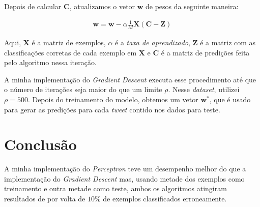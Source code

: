 \documentclass[a4paper, 12pt]{article}
\begin{document}
Depois de calcular $\boldsymbol{C}$,  atualizamos o vetor $\boldsymbol{w}$
de pesos da seguinte maneira:

\begin{align*}
    \boldsymbol{w} = \boldsymbol{w} - \alpha \frac{1}{M} \boldsymbol{X}(\boldsymbol{C} - \boldsymbol{Z})
\end{align*}

Aqui, $\boldsymbol{X}$ é a matriz de exemplos, $\alpha$ é a \textit{taxa de
aprendizado}, $\boldsymbol{Z}$ é a matriz com as classificações corretas de
cada exemplo em $\boldsymbol{X}$ e $\boldsymbol{C}$ é a matriz de predições
feita pelo algoritmo nessa iteração.

A minha implementação do \textit{Gradient Descent} executa esse procedimento
até que o número de iterações seja maior do que um limite $\rho$. Nesse
\textit{dataset}, utilizei $\rho = 500$. Depois do treinamento do modelo,
obtemos um vetor $\boldsymbol{w}^{*}$, que é usado para gerar as predições para cada
\textit{tweet} contido nos dados para teste.

\section{Conclusão} \label{sec:concl}

A minha implementação do \textit{Perceptron} teve um desempenho melhor do que a
implementação do \textit{Gradient Descent} mas, usando metade dos exemplos como
treinamento e outra metade como teste, ambos os algoritmos atingiram resultados
de por volta de $10\%$ de exemplos classificados erroneamente.
\end{document}
